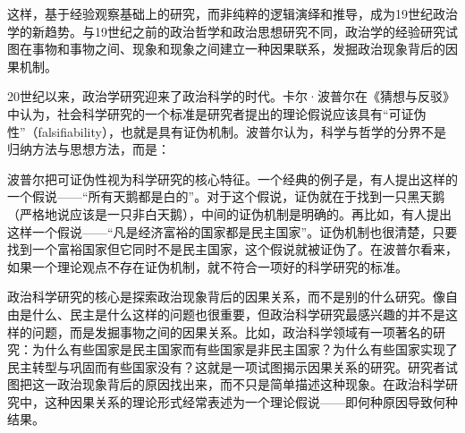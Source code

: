
这样，基于经验观察基础上的研究，而非纯粹的逻辑演绎和推导，成为19世纪政治学的新趋势。与19世纪之前的政治哲学和政治思想研究不同，政治学的经验研究试图在事物和事物之间、现象和现象之间建立一种因果联系，发掘政治现象背后的因果机制。


20世纪以来，政治学研究迎来了政治科学的时代。卡尔·波普尔在《猜想与反驳》中认为，社会科学研究的一个标准是研究者提出的理论假说应该具有“可证伪性”（falsifiability），也就是具有证伪机制。波普尔认为，科学与哲学的分界不是归纳方法与思想方法，而是：


波普尔把可证伪性视为科学研究的核心特征。一个经典的例子是，有人提出这样的一个假说——“所有天鹅都是白的”。对于这个假说，证伪就在于找到一只黑天鹅（严格地说应该是一只非白天鹅），中间的证伪机制是明确的。再比如，有人提出这样一个假说——“凡是经济富裕的国家都是民主国家”。证伪机制也很清楚，只要找到一个富裕国家但它同时不是民主国家，这个假说就被证伪了。在波普尔看来，如果一个理论观点不存在证伪机制，就不符合一项好的科学研究的标准。

政治科学研究的核心是探索政治现象背后的因果关系，而不是别的什么研究。像自由是什么、民主是什么这样的问题也很重要，但政治科学研究最感兴趣的并不是这样的问题，而是发掘事物之间的因果关系。比如，政治科学领域有一项著名的研究：为什么有些国家是民主国家而有些国家是非民主国家？为什么有些国家实现了民主转型与巩固而有些国家没有？这就是一项试图揭示因果关系的研究。研究者试图把这一政治现象背后的原因找出来，而不只是简单描述这种现象。在政治科学研究中，这种因果关系的理论形式经常表述为一个理论假说——即何种原因导致何种结果。

